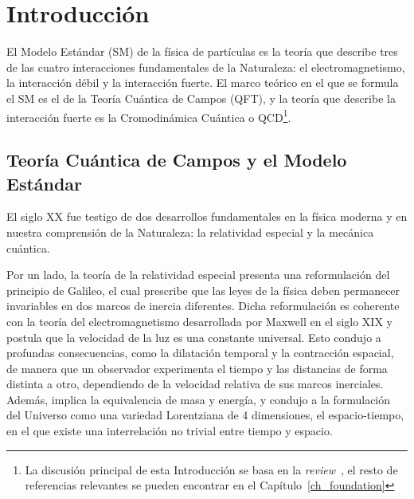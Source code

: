 \chapter*{Introducci\'on}


El Modelo Estándar (SM) de la física de partículas es la teoría que describe tres de las cuatro interacciones fundamentales de la Naturaleza: el electromagnetismo, la interacción débil y la interacción fuerte. El marco teórico en el que se formula el SM es el de la Teoría Cuántica de Campos (QFT), y la teoría que describe la interacción fuerte es la Cromodinámica Cuántica o QCD\footnote{La discusión principal de esta Introducción se basa en la \textit{review}~\citep{Wilczek:1998ma}, el resto de referencias relevantes se pueden encontrar en el Capítulo~\ref{ch_foundation}}.

\section*{Teoría Cuántica de Campos y el Modelo Estándar}

El siglo XX fue testigo de dos desarrollos fundamentales en la física moderna y en nuestra comprensión de la Naturaleza: la relatividad especial y la mecánica cuántica. 

Por un lado, la teoría de la relatividad especial presenta una reformulación del principio de Galileo, el cual prescribe que las leyes de la física deben permanecer invariables en dos marcos de inercia diferentes. Dicha reformulación es coherente con la teoría del electromagnetismo desarrollada por Maxwell en el siglo XIX y postula que la velocidad de la luz es una constante universal. Esto condujo a profundas consecuencias, como la dilatación temporal y la contracción espacial, de manera que un observador experimenta el tiempo y las distancias de forma distinta a otro, dependiendo de la velocidad relativa de sus marcos inerciales. Además, implica la equivalencia de masa y energía, y condujo a la formulación del Universo como una variedad Lorentziana de 4 dimensiones, el espacio-tiempo, en el que existe una interrelación no trivial entre tiempo y espacio.

